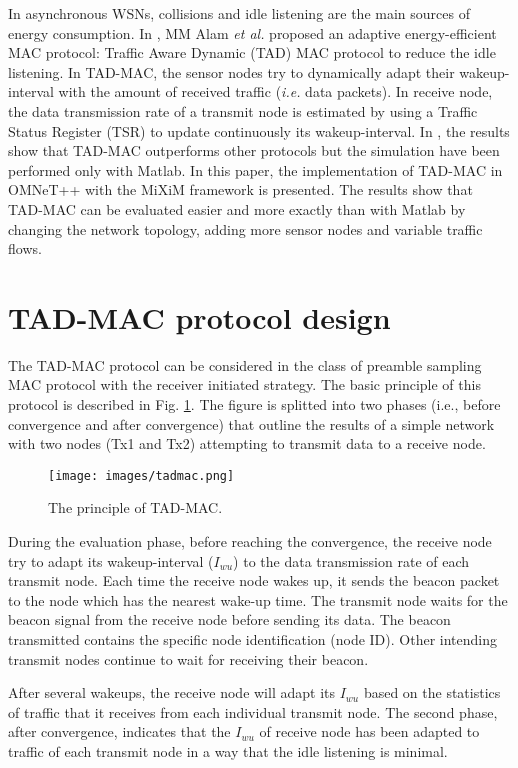 \documentclass[conference]{IEEEtran}
\begin{document}
In asynchronous WSNs, collisions and idle listening are the main sources of energy consumption. In \cite{AlamBMS12}, MM Alam \textit{et al.} proposed an adaptive energy-efficient MAC protocol: Traffic Aware Dynamic (TAD) MAC protocol to reduce the idle listening. In TAD-MAC, the sensor nodes try to dynamically adapt their wakeup-interval  with the amount of received traffic (\textit{i.e.} data packets). In receive node, the data transmission rate of a transmit node is estimated by using a Traffic Status Register (TSR) to update continuously its wakeup-interval. In \cite{AlamBMS12}, the results show that TAD-MAC outperforms other protocols but the simulation have been performed only with Matlab. In this paper, the implementation of TAD-MAC in OMNeT++ with the MiXiM framework is presented. The results show that TAD-MAC can be evaluated easier and more exactly than with Matlab by changing the network topology, adding more sensor nodes and variable traffic flows.

\section{TAD-MAC protocol design}
\label{sec:protocol}
The TAD-MAC protocol can be considered in the class of preamble sampling MAC protocol with the receiver initiated strategy. The basic principle of this protocol is described in Fig. \ref{fig:tadmac}. The figure is splitted into two phases (i.e., before convergence and after convergence) that outline the results of a simple network with two nodes (Tx1 and Tx2) attempting to transmit data to a receive node.

\begin{figure}[!t]
\centering
\texttt{[image: images/tadmac.png]}
\caption{The principle of TAD-MAC.}
\label{fig:tadmac}
\end{figure}

During the evaluation phase, before reaching the convergence, the receive node try to adapt its wakeup-interval ($I_{wu}$) to the data transmission rate of each transmit node. Each time the receive node wakes up, it sends the beacon packet to the node which has the nearest wake-up time. The transmit node waits for the beacon signal from the receive node before sending its data. The beacon transmitted contains the specific node identification (node ID). Other intending transmit nodes continue to wait for receiving their beacon.

After several wakeups, the receive node will adapt its $I_{wu}$ based on the statistics of traffic that it receives from each individual transmit node. The second phase, after convergence, indicates that the $I_{wu}$ of receive node has been adapted to traffic of each transmit node in a way that the idle listening is minimal.
 
\end{document}
